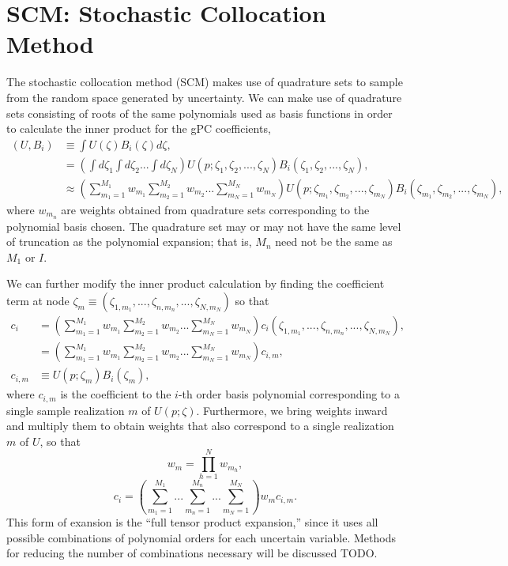 \section{SCM: Stochastic Collocation Method}
The stochastic collocation method (SCM) makes use of quadrature sets to sample from the random space generated by uncertainty.  We can make use of quadrature sets consisting of roots of the same polynomials used as basis functions in order to calculate the inner product for the gPC coefficients,
\begin{align}
(U,B_i)&\equiv\int U(\zeta) B_i(\zeta)d\zeta, \\
  &=\left( \int d\zeta_1 \int d\zeta_2 ... \int d\zeta_N\right)
        U(p;\zeta_1,\zeta_2,...,\zeta_N)B_i(\zeta_1,\zeta_2,...,\zeta_N), \\
 &\approx\left(\sum_{m_1=1}^{M_1}w_{m_1}\sum_{m_2=1}^{M_2}w_{m_2}...\sum_{m_N=1}^{M_N}w_{m_N}\right)
        U(p;\zeta_{m_1},\zeta_{m_2},...,\zeta_{m_N})B_i(\zeta_{m_1},\zeta_{m_2},...,\zeta_{m_N}),
\end{align}
where $w_{m_n}$ are weights obtained from quadrature sets corresponding to the polynomial basis chosen.  The quadrature set may or may not have the same level of truncation as the polynomial expansion; that is, $M_n$ need not be the same as $M_1$ or $I$.

We can further modify the inner product calculation by finding the coefficient term at node $\zeta_m\equiv(\zeta_{1,m_1},...,\zeta_{n,m_n},...,\zeta_{N,m_N})$ so that
\begin{align}
c_i&=\left(\sum_{m_1=1}^{M_1}w_{m_1}\sum_{m_2=1}^{M_2}w_{m_2}...\sum_{m_N=1}^{M_N}w_{m_N}\right)
        c_i(\zeta_{1,m_1},...,\zeta_{n,m_n},...,\zeta_{N,m_N}),\\
  &= \left(\sum_{m_1=1}^{M_1}w_{m_1}\sum_{m_2=1}^{M_2}w_{m_2}...\sum_{m_N=1}^{M_N}w_{m_N}\right)
        c_{i,m},\\
c_{i,m}&\equiv U(p;\zeta_m)B_i(\zeta_m),
\end{align}
where $c_{i,m}$ is the coefficient to the $i$-th order basis polynomial corresponding to a single sample realization $m$ of $U(p;\zeta)$.  Furthermore, we bring weights inward and multiply them to obtain weights that also correspond to a single realization $m$ of $U$, so that
\begin{equation}
w_m=\prod_{h=1}^N w_{m_h},
\end{equation}
\begin{equation}
c_i=\left(\sum_{m_1=1}^{M_1}...\sum_{m_n=1}^{M_n}...\sum_{m_N=1}^{M_N}\right)w_m c_{i,m}.
\end{equation}
This form of exansion is the ``full tensor product expansion,'' since it uses all possible combinations of polynomial orders for each uncertain variable.  Methods for reducing the number of combinations necessary will be discussed TODO.

